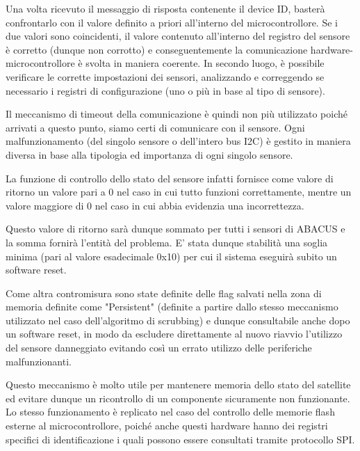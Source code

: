 \documentclass[LaM,binding=0.6cm,oneside]{../sapthesis}
\begin{document}
Una volta ricevuto il messaggio di risposta contenente il device ID, basterà confrontarlo con il valore definito a priori all’interno del microcontrollore. Se i due valori sono coincidenti, il valore contenuto all’interno del registro del sensore è corretto (dunque non corrotto) e conseguentemente la comunicazione hardware-microcontrollore è svolta in maniera coerente. In secondo luogo, è possibile verificare le corrette impostazioni dei sensori, analizzando e correggendo se necessario i registri di configurazione (uno o più in base al tipo di sensore). 

Il meccanismo di timeout della comunicazione è quindi non più utilizzato poiché arrivati a questo punto, siamo certi di comunicare con il sensore.
Ogni malfunzionamento (del singolo sensore o dell'intero bus I2C) è gestito in maniera diversa in base alla tipologia ed importanza di ogni singolo sensore.

La funzione di controllo dello stato del sensore infatti fornisce come valore di ritorno un valore pari a 0 nel caso in cui tutto funzioni correttamente, mentre un valore maggiore di 0 nel caso in cui abbia evidenzia una incorrettezza.

Questo valore di ritorno sarà dunque sommato per tutti i sensori di ABACUS e la somma fornirà l'entità del problema. E' stata dunque stabilità una soglia minima (pari al valore esadecimale 0x10) per cui il sistema eseguirà subito un software reset.

Come altra contromisura sono state definite delle flag salvati nella zona di memoria definite come "Persistent" (definite a partire dallo stesso meccanismo utilizzato nel caso dell'algoritmo di scrubbing) e dunque consultabile anche dopo un software reset, in modo da escludere direttamente al nuovo riavvio l'utilizzo del sensore danneggiato evitando così un errato utilizzo delle periferiche malfunzionanti. 

Questo  meccanismo è molto utile per mantenere memoria dello stato del satellite ed evitare dunque un ricontrollo di un componente sicuramente non funzionante.
\newline\newline
Lo stesso funzionamento è replicato nel caso del controllo delle memorie flash esterne al microcontrollore, poiché anche questi hardware hanno dei registri specifici di identificazione i quali possono essere consultati tramite protocollo SPI.
\end{document}
